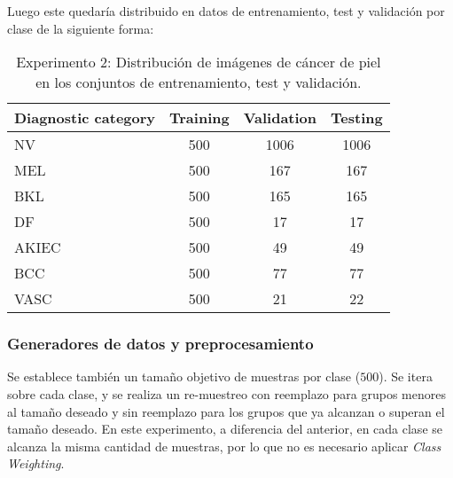 Luego este quedaría distribuido en datos de entrenamiento, test y  validación por clase de la siguiente forma:
   \begin{table}[ht]
      \centering
      \begin{tabular}{lccc}
      \hline
      \textbf{Diagnostic category} & \textbf{Training} & \textbf{Validation} & \textbf{Testing} \\
      \hline
      NV    & 500 & 1006 & 1006 \\
      MEL   & 500 & 167  & 167  \\
      BKL   & 500 & 165  & 165  \\
      DF    & 500 & 17   & 17   \\
      AKIEC & 500 & 49   & 49   \\
      BCC   & 500 & 77   & 77   \\
      VASC  & 500 & 21   & 22   \\
      \hline
      \end{tabular}
      \caption{Experimento 2: Distribución de imágenes de cáncer de piel en los conjuntos de entrenamiento, test y validación.}
      \label{tab:train_test_validate_e2}
      \end{table}
 
\subsubsection*{Generadores de datos y preprocesamiento}

Se establece también un tamaño objetivo de muestras por clase ($500$). Se itera sobre cada clase, y se realiza un re-muestreo con reemplazo para grupos menores al tamaño deseado y sin reemplazo para los grupos que ya alcanzan o superan el tamaño deseado. 
En este experimento, a diferencia del anterior, en cada clase se alcanza la misma cantidad de muestras, por lo que no es necesario aplicar \textit{Class Weighting}.